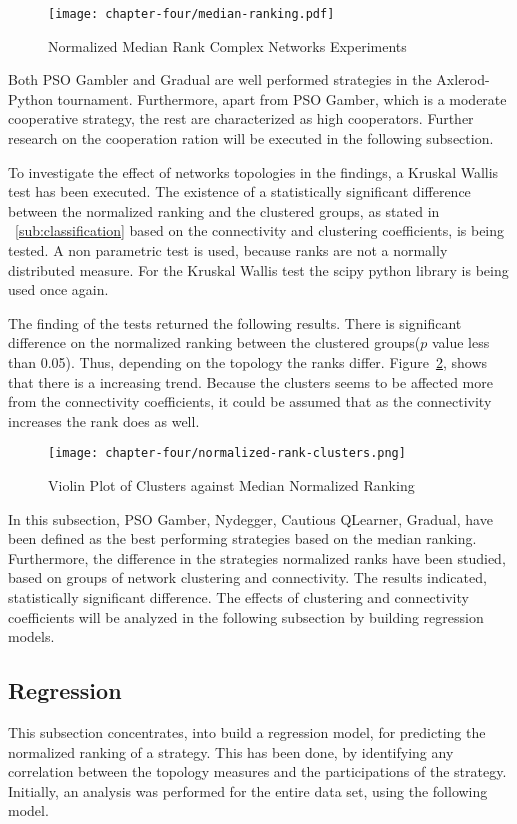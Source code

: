 \begin{figure}[!hbtp]
	\texttt{[image: chapter-four/median-ranking.pdf]}
	\caption{Normalized Median Rank Complex Networks Experiments}
	\label{fig:ranking-second-gen}
\end{figure}

Both PSO Gambler and Gradual are well performed strategies in the Axlerod-Python
tournament. Furthermore, apart from PSO Gamber, which is a moderate cooperative
strategy, the rest are characterized as high cooperators. Further research on
the cooperation ration will be executed in the following subsection.

To investigate the effect of networks topologies in the findings, a Kruskal Wallis test
has been executed. The existence of a statistically significant difference between
the normalized ranking and the clustered groups, as stated in ~\autoref{sub:classification} based on the
connectivity and clustering coefficients, is being tested. A non parametric test
is used, because ranks are not a normally distributed measure. For the Kruskal Wallis
test the scipy python library is being used once again.

The finding of the tests returned the following results. There is significant
difference on the normalized ranking between the clustered groups(\(p\)
value less than 0.05). Thus, depending on the topology the ranks differ.
Figure~\ref{fig:variation-clusters}, shows that there is a increasing trend.
Because the clusters seems to be affected more from the connectivity coefficients,
it could be assumed that as the connectivity increases the rank does as well.

\begin{figure}[!hbtp]
	\texttt{[image: chapter-four/normalized-rank-clusters.png]}
	\caption{Violin Plot of Clusters against Median Normalized Ranking}
	\label{fig:variation-clusters}
\end{figure}

In this subsection, PSO Gamber, Nydegger, Cautious QLearner, Gradual, have been
defined as the best performing strategies based on the median ranking.
Furthermore, the difference in the strategies normalized ranks have been studied,
based on groups of network clustering and connectivity. The results indicated,
statistically significant difference. The effects of clustering and connectivity
coefficients will be analyzed in the following subsection by building regression
models.

\subsection{Regression}
This subsection concentrates, into build a regression model, for predicting
the normalized ranking of a strategy. This has been done, by identifying any
correlation between the topology measures and the participations of the strategy.
Initially, an analysis was performed for the entire data set, using the following
model.

